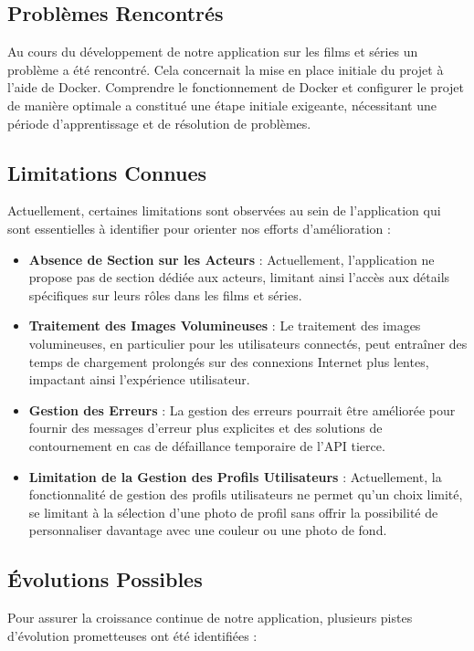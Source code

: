 \documentclass[a4paper]{article}
\begin{document}
\subsection{Problèmes Rencontrés}
Au cours du développement de notre application sur les films et séries un problème a été rencontré. Cela concernait la mise en place initiale du projet à l'aide de Docker. Comprendre le fonctionnement de Docker et configurer le projet de manière optimale a constitué une étape initiale exigeante, nécessitant une période d'apprentissage et de résolution de problèmes. 

\subsection{Limitations Connues}
Actuellement, certaines limitations sont observées au sein de l'application qui sont essentielles à identifier pour orienter nos efforts d'amélioration :

\begin{itemize}
    \item \textbf{Absence de Section sur les Acteurs} : Actuellement, l'application ne propose pas de section dédiée aux acteurs, limitant ainsi l'accès aux détails spécifiques sur leurs rôles dans les films et séries.
    \item \textbf{Traitement des Images Volumineuses} : Le traitement des images volumineuses, en particulier pour les utilisateurs connectés, peut entraîner des temps de chargement prolongés sur des connexions Internet plus lentes, impactant ainsi l'expérience utilisateur.
    \item \textbf{Gestion des Erreurs} : La gestion des erreurs pourrait être améliorée pour fournir des messages d'erreur plus explicites et des solutions de contournement en cas de défaillance temporaire de l'API tierce.
    \item \textbf{Limitation de la Gestion des Profils Utilisateurs} : Actuellement, la fonctionnalité de gestion des profils utilisateurs ne permet qu'un choix limité, se limitant à la sélection d'une photo de profil sans offrir la possibilité de personnaliser davantage avec une couleur ou une photo de fond.
\end{itemize}

\subsection{Évolutions Possibles}

Pour assurer la croissance continue de notre application, plusieurs pistes d'évolution prometteuses ont été identifiées :
\end{document}
